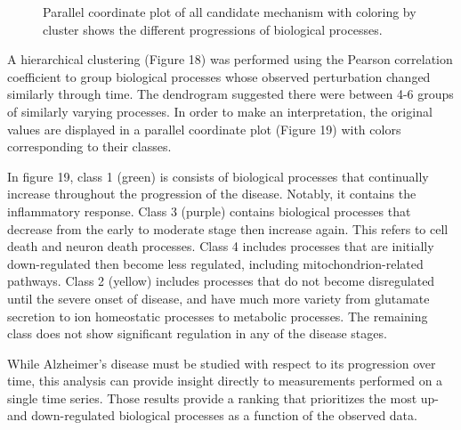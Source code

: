 \begin{figure}
\captionsetup{format=plain}
\caption[Time-series Candidate Mechanism Perturbation Amplitude Score]{Parallel coordinate plot of all candidate mechanism with coloring by cluster shows the different progressions of biological processes.}
\label{Fig:time_series_pc}
\end{figure}

A hierarchical clustering (Figure 18) was performed using the Pearson correlation coefficient to group biological processes whose observed perturbation changed similarly through time. The dendrogram suggested there were between 4-6 groups of similarly varying processes. In order to make an interpretation, the original values are displayed in a parallel coordinate plot (Figure 19) with colors corresponding to their classes.

In figure 19, class 1 (green) is consists of biological processes that continually increase throughout the progression of the disease. Notably, it contains the inflammatory response. Class 3 (purple) contains biological processes that decrease from the early to moderate stage then increase again. This refers to cell death and neuron death processes. Class 4 includes processes that are initially down-regulated then become less regulated, including mitochondrion-related pathways. Class 2 (yellow) includes processes that do not become disregulated until the severe onset of disease, and have much more variety from glutamate secretion to ion homeostatic processes to metabolic processes. The remaining class does not show significant regulation in any of the disease stages. 

While Alzheimer's disease must be studied with respect to its progression over time, this analysis can provide insight directly to measurements performed on a single time series. Those results provide a ranking that prioritizes the most up- and down-regulated biological processes as a function of the observed data. 
